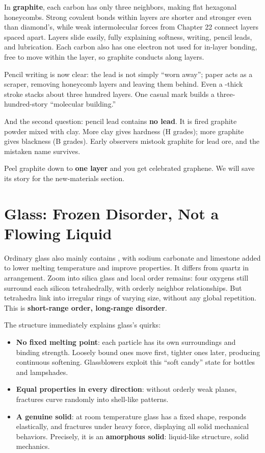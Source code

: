 In \textbf{graphite}, each carbon has only three neighbors, making flat hexagonal honeycombs. Strong covalent bonds within layers are shorter and stronger even than diamond's, while weak intermolecular forces from Chapter 22 connect layers spaced  apart. Layers slide easily, fully explaining softness, writing, pencil leads, and lubrication. Each carbon also has one electron not used for in-layer bonding, free to move within the layer, so graphite conducts along layers.

Pencil writing is now clear: the lead is not simply ``worn away''; paper acts as a scraper, removing honeycomb layers and leaving them behind. Even a -thick stroke stacks about three hundred layers. One casual mark builds a three-hundred-story ``molecular building.''

And the second question: pencil lead contains \textbf{no lead}. It is fired graphite powder mixed with clay. More clay gives hardness (H grades); more graphite gives blackness (B grades). Early observers mistook graphite for lead ore, and the mistaken name survives.

Peel graphite down to \textbf{one layer} and you get celebrated graphene. We will save its story for the new-materials section.

\section{Glass: Frozen Disorder, Not a Flowing Liquid}

Ordinary glass also mainly contains , with sodium carbonate and limestone added to lower melting temperature and improve properties. It differs from quartz in arrangement. Zoom into silica glass and local order remains: four oxygens still surround each silicon tetrahedrally, with orderly neighbor relationships. But tetrahedra link into irregular rings of varying size, without any global repetition. This is \textbf{short-range order, long-range disorder}.

The structure immediately explains glass's quirks:

\begin{itemize}[itemsep=2pt]
\item \textbf{No fixed melting point}: each particle has its own surroundings and binding strength. Loosely bound ones move first, tighter ones later, producing continuous softening. Glassblowers exploit this ``soft candy'' state for bottles and lampshades.
\item \textbf{Equal properties in every direction}: without orderly weak planes, fractures curve randomly into shell-like patterns.
\item \textbf{A genuine solid}: at room temperature glass has a fixed shape, responds elastically, and fractures under heavy force, displaying all solid mechanical behaviors. Precisely, it is an \textbf{amorphous solid}: liquid-like structure, solid mechanics.
\end{itemize}

